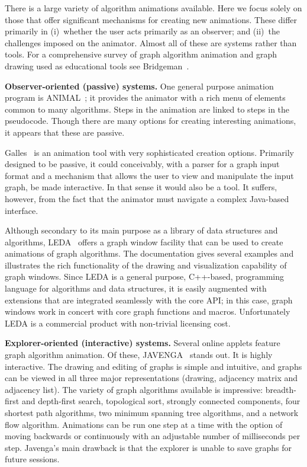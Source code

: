 There is a large variety of algorithm animations available. Here we focus solely on those that offer significant mechanisms for creating new animations.
These differ primarily in (i)~whether the user acts primarily as an observer; and
(ii)~the challenges imposed on the animator.
Almost all of these are systems rather than tools.
For a comprehensive survey of graph algorithm animation and graph drawing used
as educational tools see Bridgeman~\cite{2013-GDBook-Bridgeman}. 

\textbf{Observer-oriented (passive) systems.}
One general purpose animation program is ANIMAL~\cite{2002-JVLC-Roessling,ANIMAL};
it provides the animator
with a rich menu
of elements common to many algorithms.
Steps in the animation are linked to steps in the pseudocode.
Though there are many options for creating interesting animations,
it appears that these are passive.

Galles~\cite{Galles} is an animation tool with very
sophisticated creation options.
Primarily designed to be passive, it could conceivably, with a parser
for a graph input format and a mechanism that allows the user to view and
manipulate the input graph, be made interactive.
In that sense it would also be a tool.
It suffers, however, from the fact that the
animator must navigate a complex Java-based interface.

Although secondary to its main purpose as a library of data structures and
algorithms,
LEDA~\cite{1999-LEDA-Mehlhorn} offers a graph window facility that can be
used to create animations of graph algorithms.
The documentation gives several examples and illustrates the rich functionality of
the drawing and visualization capability of graph windows.
Since LEDA is a general purpose, C++-based, programming language for
algorithms and data structures, it is easily augmented with extensions that
are integrated seamlessly with the core API; in this case, graph windows work
in concert with core graph functions and macros.
Unfortunately LEDA is a commercial product with
non-trivial licensing cost.

\textbf{Explorer-oriented (interactive) systems.}
Several online applets feature graph algorithm animation. Of these,
JAVENGA~\cite{JAVENGA} stands out. It is highly interactive. The drawing and
editing of
graphs is simple and intuitive, and graphs can be viewed in all three major
representations (drawing, adjacency matrix and adjacency list).
The variety of graph algorithms available is impressive:
breadth-first and depth-first search, topological sort, strongly connected
components, four shortest path algorithms, two minimum spanning tree
algorithms, and a network flow algorithm.
Animations can be run one step at a time with the option of moving backwards
or continuously with an adjustable number of milliseconds per step.
Javenga's main drawback is that the explorer is unable to save graphs for
future sessions.

